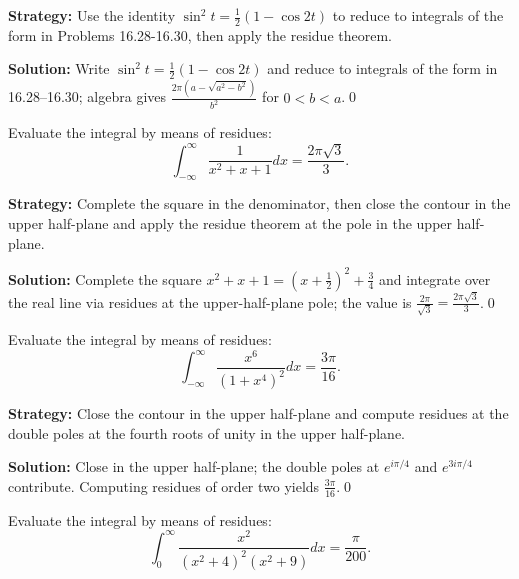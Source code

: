 \noindent\textbf{Strategy:} Use the identity \( \sin^2 t = \frac{1}{2}(1 - \cos 2t) \) to reduce to integrals of the form in Problems 16.28-16.30, then apply the residue theorem.

\bigskip\noindent\textbf{Solution:}
Write $\sin^2 t=\tfrac{1}{2}(1-\cos 2t)$ and reduce to integrals of the form in 16.28–16.30; algebra gives $\frac{2\pi(a-\sqrt{a^2-b^2})}{b^2}$ for $0<b<a$.\qed


\begin{problembox}
\begin{problemstatement}
Evaluate the integral by means of residues:
\[ \int_{-\infty}^{\infty} \frac{1}{x^2 + x + 1} dx = \frac{2\pi \sqrt{3}}{3}. \]
\end{problemstatement}
\end{problembox}

\noindent\textbf{Strategy:} Complete the square in the denominator, then close the contour in the upper half-plane and apply the residue theorem at the pole in the upper half-plane.

\bigskip\noindent\textbf{Solution:}
Complete the square $x^2+x+1=(x+\tfrac12)^2+\tfrac34$ and integrate over the real line via residues at the upper-half-plane pole; the value is $\frac{2\pi}{\sqrt{3}}=\frac{2\pi\sqrt{3}}{3}$.\qed


\begin{problembox}
\begin{problemstatement}
Evaluate the integral by means of residues:
\[ \int_{-\infty}^{\infty} \frac{x^6}{(1 + x^4)^2} dx = \frac{3\pi}{16}. \]
\end{problemstatement}
\end{problembox}

\noindent\textbf{Strategy:} Close the contour in the upper half-plane and compute residues at the double poles at the fourth roots of unity in the upper half-plane.

\bigskip\noindent\textbf{Solution:}
Close in the upper half-plane; the double poles at $e^{i\pi/4}$ and $e^{3i\pi/4}$ contribute. Computing residues of order two yields $\frac{3\pi}{16}$.\qed


\begin{problembox}
\begin{problemstatement}
Evaluate the integral by means of residues:
\[ \int_0^{\infty} \frac{x^2}{(x^2 + 4)^2 (x^2 + 9)} dx = \frac{\pi}{200}. \]
\end{problemstatement}
\end{problembox}

